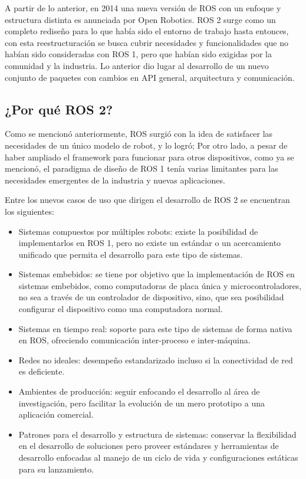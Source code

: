 A partir de lo anterior, en 2014 una nueva versión de ROS con un enfoque y estructura distinta es anunciada por Open Robotics.  ROS 2 surge como un completo rediseño para lo que había sido el entorno de trabajo hasta entonces, con esta reestructuración se busca cubrir necesidades y funcionalidades que no habían sido consideradas con  ROS 1, pero que habían sido exigidas por la comunidad y la industria. Lo anterior dio lugar al desarrollo de un nuevo conjunto de paquetes con cambios en API general, arquitectura y comunicación. 

\subsection{¿Por qué ROS 2?}

Como se mencionó anteriormente, ROS surgió con la idea de satisfacer las necesidades de un único modelo de robot, y lo logró; Por otro lado, a pesar de haber ampliado el framework para funcionar para otros dispositivos, como ya se mencionó, el paradigma de diseño de ROS 1 tenía varias limitantes para las necesidades emergentes de la industria y nuevas aplicaciones.

Entre los nuevos casos de uso que dirigen el desarrollo de ROS 2 se encuentran los siguientes:

\begin{itemize}
    \item Sistemas compuestos por múltiples robots: existe la posibilidad de implementarlos en ROS 1, pero no existe un estándar o un acercamiento unificado que permita el desarrollo para este tipo de sistemas.
    \item Sistemas embebidos: se tiene por objetivo que la implementación de ROS en sistemas embebidos, como computadoras de placa única y microcontroladores, no sea a través de un controlador de dispositivo, sino, que sea posibilidad configurar el dispositivo como una computadora normal.
    \item Sistemas en tiempo real: soporte para este tipo de sistemas de forma nativa en ROS, ofreciendo comunicación inter-proceso e inter-máquina.
    \item Redes no ideales: desempeño estandarizado incluso si la conectividad de red es deficiente.
    \item Ambientes de producción: seguir enfocando el desarrollo al área de investigación, pero facilitar la evolución de un mero prototipo a una aplicación comercial.
    \item Patrones para el desarrollo y estructura de sistemas: conservar la flexibilidad en el desarrollo de soluciones pero proveer estándares y herramientas de desarrollo enfocadas al manejo de un ciclo de vida y configuraciones estáticas para su lanzamiento.
\end{itemize}

